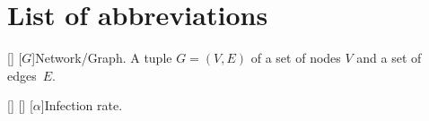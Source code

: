 \section*{List of abbreviations}

\begin{acronym}[nnzzzzzzz] %

\acro{}[\color{Steel}{Static networks}\color{Cayenne}{.}]{}
[$G$]{Network/Graph. A tuple $G=(V,E)$ of a set of nodes $V$ and a set of edges~$E$.}

\acro{}[]{}
\acro{}[\color{Steel}{Epidemic models}\color{Cayenne}{.}]{}
[$\alpha $]{Infection rate.}

\end{acronym}
